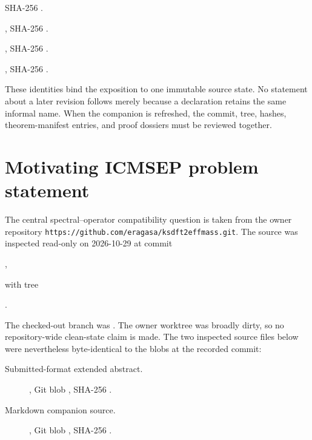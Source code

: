 \begin{description}
    SHA-256
    .
  \item[Onsite/nononsite power partition.]
    ,
    SHA-256
    .
  \item[Integer-lattice shell radii.]
    ,
    SHA-256
    .
  \item[Projection-induced loss of finite support.]
    ,
    SHA-256
    .
\end{description}

These identities bind the exposition to one immutable source state. No statement about a
later revision follows merely because a declaration retains the same informal name.
When the companion is refreshed, the commit, tree, hashes, theorem-manifest entries, and
proof dossiers must be reviewed together.

\section{Motivating ICMSEP problem statement}

The central spectral--operator compatibility question is taken from the owner repository
\nolinkurl{https://github.com/eragasa/ksdft2effmass.git}.  The source was inspected
read-only on 2026-10-29 at commit

\begin{center}
,
\end{center}

with tree

\begin{center}
.
\end{center}

The checked-out branch was
.  The owner worktree was broadly
dirty, so no repository-wide clean-state claim is made.  The two inspected source files
below were nevertheless byte-identical to the blobs at the recorded commit:

\begin{description}
  \item[Submitted-format extended abstract.]
    ,
    Git blob ,
    SHA-256
    .
  \item[Markdown companion source.]
    ,
    Git blob ,
    SHA-256
    .
\end{description}


